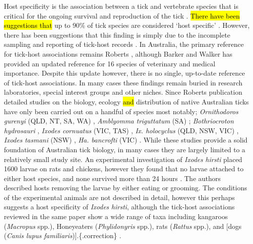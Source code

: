 \documentclass[a4paper, nobind]{templates/ociamthesis}
\begin{document}
Host specificity is the association between a tick and vertebrate species that is critical for the ongoing survival and reproduction of the tick \autocite{hoogstraalTickhostSpecificity1982}.
\hl{There have been suggestions that} up to 90\% of tick species are considered `host specific' \autocite{hoogstraalTickhostSpecificity1982}.
However, there has been suggestions that this finding is simply due to the incomplete sampling and reporting of tick-host records \autocite{klompenEvolutionTicks1996}.
In Australia, the primary reference for tick-host associations remains Roberts \autocite*{robertsAustralianTicks1970}, although Barker and Walker \autocite*{barkerTicksAustraliaSpecies2014} has provided an updated reference for 16 species of veterinary and medical importance.
Despite this update however, there is no single, up-to-date reference of tick-host associations.
In many cases these findings remain buried in research laboratories, special interest groups and other niches.
Since Roberts \autocite*{robertsAustralianTicks1970} publication detailed studies on the biology, ecology \hl{and} distribution of native Australian ticks have only been carried out on a handful of species most notably; \emph{Ornithodoros gurenyi} (QLD, NT, SA, WA) \autocite{doubeEcologyKangarooTick1972,doubeTwoRacesKangaroo1975}, \emph{Amblyomma triguttatum} (SA) \autocite{waudbySeasonalDensityFluctuations2007}; \emph{Bothriocroton hydrosauri} \autocite{bullDispersalAustralianReptile1978,andrewsMatingBehaviourAustralian1980,belanHostDetectionFour1991,chiltonInterspecificDifferencesMicrohabitat1993}, \emph{Ixodes cornuatus} (VIC, TAS) \autocite{jacksonGeneticVariationTicks2000,jacksonDistributionsParalysisTicks2007,songPhylogeneticPhylogeographicRelationships2011}, \emph{Ix. holocyclus} (QLD, NSW, VIC) \autocite{doubeSeasonalPatternsAbundance1979,jacksonGeneticVariationTicks2000,jacksonDistributionsParalysisTicks2007,songPhylogeneticPhylogeographicRelationships2011}, \emph{Ixodes tasmani} (NSW) \autocite{murdochEcologyCommonMarsupial2005}, \emph{Ha. bancrofti} (VIC) \autocite{laanOccuranceTickHaemaphysalis2011}.
While these studies provide a solid foundation of Australian tick biology, in many cases they are largely limited to a relatively small study site.
An experimental investigation of \emph{Ixodes hirsti} placed 1600 larvae on rats and chickens, however they found that no larvae attached to either host species, and none survived more than 24 hours \autocite{laanObservationsBiologyDistribution2011}.
The authors described hosts removing the larvae by either eating or grooming.
The conditions of the experimental animals are not described in detail, however this perhaps suggests a host specificity of \emph{Ixodes hirsti}, although the tick-host associations reviewed in the same paper show a wide range of taxa including kangaroos (\emph{Macropus} spp.), Honeyeaters (\emph{Phylidonyris} spp.), rats (\emph{Rattus} spp.), and {[}dogs (\emph{Canis lupus familiaris}){]}.\{.correction\} \autocite{laanObservationsBiologyDistribution2011}.
\end{document}
